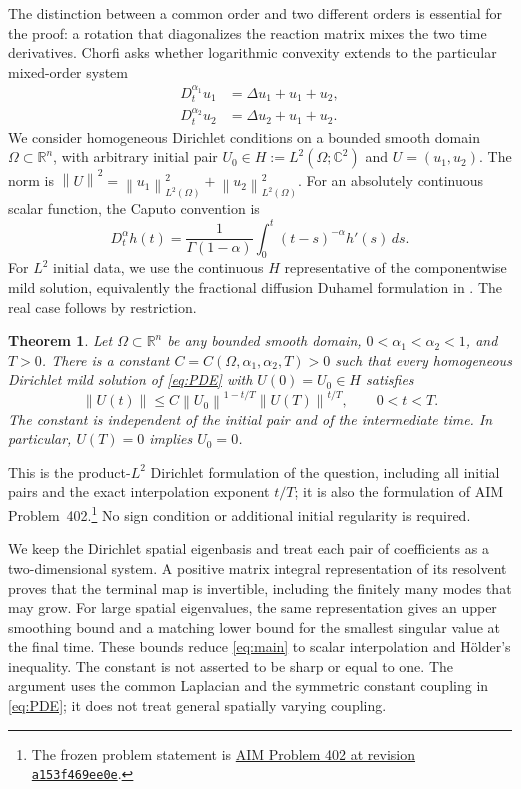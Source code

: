 \documentclass[11pt]{article}
\newtheorem{theorem}{Theorem}
\newcommand{\R}{\mathbb R}
\newcommand{\C}{\mathbb C}
\newcommand{\norm}[1]{\left\lVert#1\right\rVert}
\begin{document}
The distinction between a common order and two different orders is essential
for the proof: a rotation that diagonalizes the reaction matrix mixes the two
time derivatives. Chorfi \cite[Section 5, problem 1]{Chorfi} asks whether
logarithmic convexity extends to the particular mixed-order system
\begin{equation}\label{eq:PDE}
 \begin{aligned}
 D_t^{\alpha_1}u_1&=\Delta u_1+u_1+u_2,\\
 D_t^{\alpha_2}u_2&=\Delta u_2+u_1+u_2.
 \end{aligned}
\end{equation}
We consider homogeneous Dirichlet conditions on a bounded smooth domain
$\Omega\subset\R^n$, with arbitrary initial pair
$U_0\in H:=L^2(\Omega;\C^2)$ and $U=(u_1,u_2)$.
The norm is
$\norm U^2=\norm{u_1}_{L^2(\Omega)}^2+\norm{u_2}_{L^2(\Omega)}^2$.
For an absolutely continuous scalar function, the Caputo convention is
\[
 D_t^\alpha h(t)=\frac1{\Gamma(1-\alpha)}
       \int_0^t(t-s)^{-\alpha}h'(s)\,ds.
\]
For $L^2$ initial data, we use the continuous $H$ representative of the
componentwise mild solution, equivalently the fractional diffusion Duhamel
formulation in \cite[Definition 1]{LHL}. The real case follows by restriction.

\begin{theorem}\label{thm:main}
Let $\Omega\subset\R^n$ be any bounded smooth domain,
$0<\alpha_1<\alpha_2<1$, and $T>0$.
There is a constant $C=C(\Omega,\alpha_1,\alpha_2,T)>0$ such that every
homogeneous Dirichlet mild solution of \eqref{eq:PDE} with
$U(0)=U_0\in H$ satisfies
\begin{equation}\label{eq:main}
 \norm{U(t)}\le C\norm{U_0}^{1-t/T}\norm{U(T)}^{t/T},
 \qquad 0<t<T.
\end{equation}
The constant is independent of the initial pair and of the intermediate
time. In particular, $U(T)=0$ implies $U_0=0$.
\end{theorem}
This is the product-$L^2$ Dirichlet formulation of the question, including all
initial pairs and the exact interpolation exponent $t/T$; it is also the
formulation of AIM Problem~402.\footnote{The frozen problem statement is
\href{https://github.com/MColbrook/AIM/blob/a153f469ee0ea64e876b2ad97c79d252c19a3e22/problems/402-mixed-order-fractional-logarithmic-convexity.md}{AIM Problem 402 at revision \texttt{a153f469ee0e}}.}
No sign condition or additional initial regularity is required.

We keep the Dirichlet spatial eigenbasis and treat each pair of coefficients
as a two-dimensional system. A positive matrix integral representation of its
resolvent proves that the terminal map is invertible, including the finitely
many modes that may grow. For large spatial eigenvalues, the same
representation gives an upper smoothing bound and a matching lower bound for
the smallest singular value at the final time. These bounds reduce
\eqref{eq:main} to scalar interpolation and H\"older's inequality.
The constant is not asserted to be sharp or equal to one. The argument uses
the common Laplacian and the symmetric constant coupling in \eqref{eq:PDE};
it does not treat general spatially varying coupling.
\end{document}
